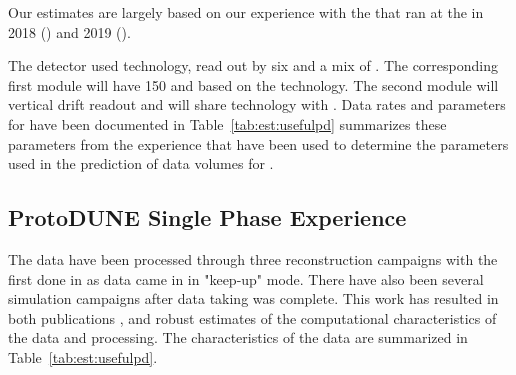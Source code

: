 \documentclass[../main-v1.tex]{subfiles}
\begin{document}
Our estimates  are largely based on our experience with the  %
 that ran at the  in 2018 () and 2019 (). 

The   detector used   technology, read out by six  and a mix of . The corresponding first  module will have 150  and   based on the  technology. The second  module will  vertical drift readout and  will share  technology with  . Data rates and parameters for  have been documented in   Table~\ref{tab:est:usefulpd} summarizes these parameters from the  experience that have been used to determine the parameters used in the prediction of data volumes for . 

\subsection{ProtoDUNE Single Phase Experience}

The  data have been processed through three reconstruction campaigns with the first done in as data came in in "keep-up" mode.
  There have also been several  simulation campaigns after data taking was complete.  This work has resulted in both publications \cite{DUNE:2021hwx,DUNE:2020fgq,DUNE:2020cqd,DUNE:2020vmp}, and robust estimates of the computational characteristics of the data and processing. The characteristics of the  data are summarized in Table~\ref{tab:est:usefulpd}.
\end{document}
